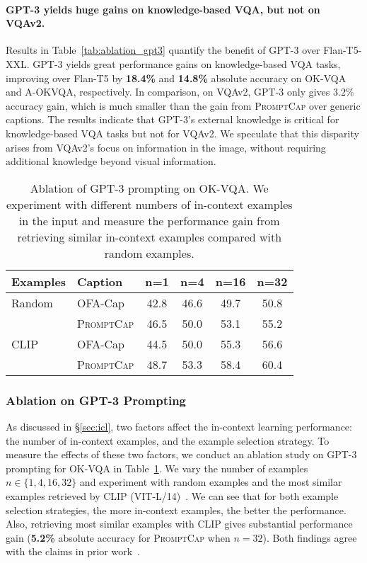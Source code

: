 \documentclass[10pt,twocolumn,letterpaper]{article}
\newcommand{\NAME}{\textsc{PromptCap}\xspace}
\begin{document}
\paragraph{GPT-3 yields huge gains on knowledge-based VQA, but not on VQAv2.} Results in Table~\ref{tab:ablation_gpt3} quantify the benefit of GPT-3 over Flan-T5-XXL. GPT-3 yields great performance gains on knowledge-based VQA tasks, improving over Flan-T5 by \textbf{18.4\%} and \textbf{14.8\%} absolute accuracy on OK-VQA and A-OKVQA, respectively. In comparison, on VQAv2, GPT-3 only gives \textbf{$3.2\%$} accuracy gain, which is much smaller than the gain from \NAME over generic captions. The results indicate that GPT-3's external knowledge is critical for knowledge-based VQA tasks but not for VQAv2. We speculate that this disparity arises from VQAv2's focus on information in the image, without requiring additional knowledge beyond visual information.

\begin{table}[h]
\small
\centering
\caption{
Ablation of GPT-3 prompting on OK-VQA. We experiment with different numbers of in-context examples in the input and measure the performance gain from retrieving similar in-context examples compared with random examples.
}
\begin{tabular}{l|l|cccc}
\toprule[1.2pt]
Examples & Caption & n=1 & n=4 & n=16 & n=32\\
\midrule
Random & OFA-Cap & 42.8 & 46.6 & 49.7 & 50.8\\
&\NAME & 46.5 & 50.0 & 53.1 & 55.2\\
\midrule
CLIP & OFA-Cap & 44.5 & 50.0 & 55.3 & 56.6\\
&\NAME & 48.7 & 53.3 & 58.4 & 60.4\\
\bottomrule[1.2pt]
\end{tabular}
\label{tab:prompt_ablation}
\end{table} 
\vspace{-0.1in}
\subsubsection{Ablation on GPT-3 Prompting}
As discussed in \S\ref{sec:icl}, two factors affect the in-context learning performance: the number of in-context examples, and the example selection strategy. To measure the effects of these two factors, we conduct an ablation study on GPT-3 prompting for OK-VQA in Table~\ref{tab:prompt_ablation}. We vary the number of examples $n\in \{1,4,16,32\}$ and experiment with random examples and the most similar examples retrieved by CLIP (VIT-L/14)~\cite{radford2021learning}. We can see that for both example selection strategies, the more in-context examples, the better the performance. Also, retrieving most similar examples with CLIP gives substantial performance gain (\textbf{5.2\%} absolute accuracy for \NAME when $n=32$). Both findings agree with the claims in prior work~\cite{brown2020language, liu-etal-2022-makes, yang2022empirical}.
\end{document}
